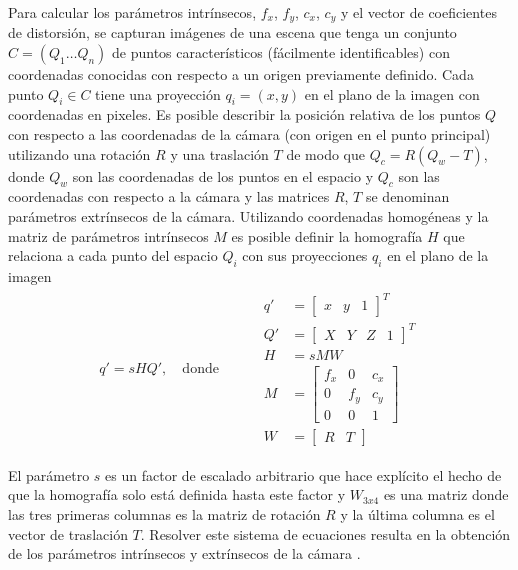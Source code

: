 Para calcular los parámetros intrínsecos, $f_x$, $f_y$, $c_x$, $c_y$ y el vector de coeficientes de distorsión, se capturan imágenes de una escena que tenga un conjunto $C=(Q_1 \dots Q_n)$ de puntos característicos (fácilmente identificables) con coordenadas conocidas con respecto a un origen previamente definido. Cada punto $Q_i\in{C}$ tiene una proyección $q_i=(x, y)$ en el plano de la imagen con coordenadas en pixeles. Es posible describir la posición relativa de los puntos $Q$ con respecto a las coordenadas de la cámara (con origen en el punto principal) utilizando una rotación $R$ y una traslación $T$ de modo que $Q_c=R(Q_w-T)$, donde $Q_w$ son las coordenadas de los puntos en el espacio y $Q_c$ son las coordenadas con respecto a la cámara y las matrices $R$, $T$ se denominan parámetros extrínsecos de la cámara. Utilizando coordenadas homogéneas y la matriz de parámetros intrínsecos $M$ es posible definir la homografía $H$ que relaciona a cada punto del espacio $Q_i$ con sus proyecciones $q_i$ en el plano de la imagen \cite{David}
\begin{equation*}
    \begin{split}
        q'=sHQ',\quad\text{donde}\qquad &
        \begin{split}
            q' & = \begin{bmatrix}x&y&1\end{bmatrix}^T\\
            Q' & = \begin{bmatrix}X&Y&Z&1\end{bmatrix}^T\\
            H & = sMW\\
            M & = \begin{bmatrix}
	            f_x & 0 & c_x \\
	            0 & f_y & c_y \\
	            0 & 0 & 1
                \end{bmatrix}\\
            W & = \begin{bmatrix}R&T\end{bmatrix}
        \end{split}
    \end{split}
\end{equation*}

El parámetro $s$ es un factor de escalado arbitrario que hace explícito el hecho de que la homografía solo está definida hasta este factor y $W_{3x4}$ es una matriz donde las tres primeras columnas es la matriz de rotación $R$ y la última columna es el vector de traslación $T$. Resolver este sistema de ecuaciones resulta en la obtención de los parámetros intrínsecos y extrínsecos de la cámara \cite{David}.

